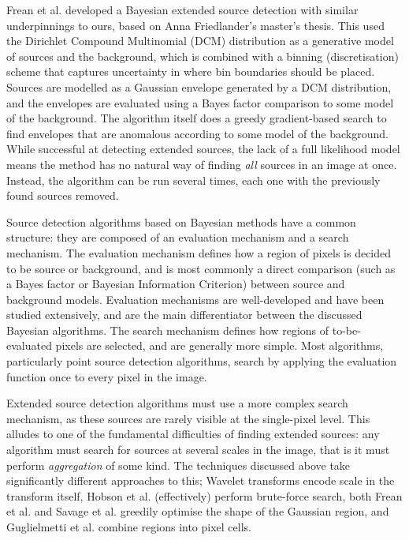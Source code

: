Frean et al. \cite{frean2014source} developed a Bayesian extended source detection with similar underpinnings to ours, based on Anna Friedlander's master's thesis. This used the Dirichlet Compound Multinomial (DCM) distribution as a generative model of sources and the background, which is combined with a binning (discretisation) scheme that captures uncertainty in where bin boundaries should be placed. Sources are modelled as a Gaussian envelope generated by a DCM distribution, and the envelopes are evaluated using a Bayes factor comparison to some model of the background. The algorithm itself does a greedy gradient-based search to find envelopes that are anomalous according to some model of the background. While successful at detecting extended sources, the lack of a full likelihood model means the method has no natural way of finding \emph{all} sources in an image at once. Instead, the algorithm can be run several times, each one with the previously found sources removed.

Source detection algorithms based on Bayesian methods have a common structure: they are composed of an evaluation mechanism and a search mechanism. The evaluation mechanism defines how a region of pixels is decided to be source or background, and is most commonly a direct comparison (such as a Bayes factor or Bayesian Information Criterion) between source and background models. Evaluation mechanisms are well-developed and have been studied extensively, and are the main differentiator between the discussed Bayesian algorithms. The search mechanism defines how regions of to-be-evaluated pixels are selected, and are generally more simple. Most algorithms, particularly point source detection algorithms, search by applying the evaluation function once to every pixel in the image.

Extended source detection algorithms must use a more complex search mechanism, as these sources are rarely visible at the single-pixel level. This alludes to one of the fundamental difficulties of finding extended sources: any algorithm must search for sources at several scales in the image, that is it must perform \emph{aggregation} of some kind. The techniques discussed above take significantly different approaches to this; Wavelet transforms encode scale in the transform itself, Hobson et al. (effectively) perform brute-force search, both Frean et al. and Savage et al. greedily optimise the shape of the Gaussian region, and Guglielmetti et al. combine regions into pixel cells.


